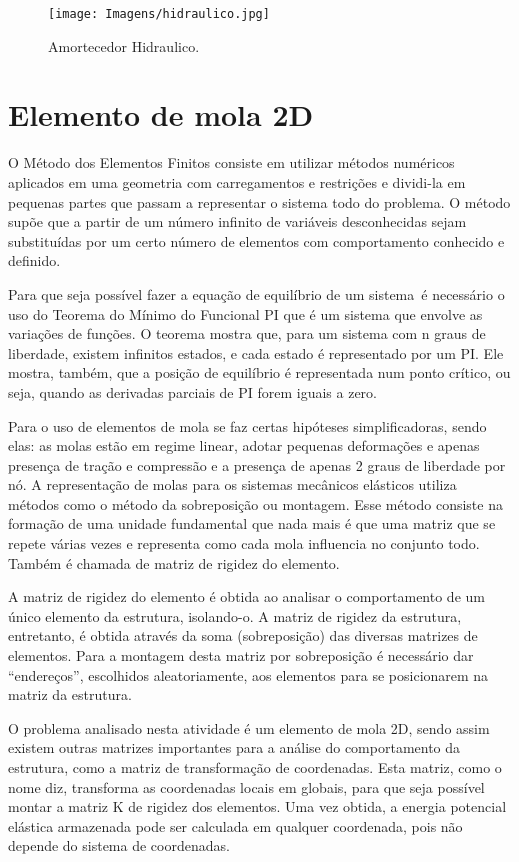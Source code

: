 \documentclass[deposito, acronym, symbols]{fei}
\begin{document}
\begin{figure}[!htb]
 \centering
    \caption{Amortecedor Hidraulico.}
    \texttt{[image: Imagens/hidraulico.jpg]}
    \label{fig:hidraulica}
 \end{figure}

\section{Elemento de mola 2D}
O Método dos Elementos Finitos consiste em utilizar métodos numéricos aplicados em uma geometria com carregamentos e restrições e dividi-la em pequenas partes que passam a representar o sistema todo do problema. O método supõe que a partir de um número infinito de variáveis desconhecidas sejam substituídas por um certo número de elementos com comportamento conhecido e definido. 

Para que seja possível fazer a equação de equilíbrio de um sistema é necessário o uso do Teorema do Mínimo do Funcional PI que é um sistema que envolve as variações de funções. O teorema mostra que, para um sistema com n graus de liberdade, existem infinitos estados, e cada estado é representado por um PI. Ele mostra, também, que a posição de equilíbrio é representada num ponto crítico, ou seja, quando as derivadas parciais de PI forem iguais a zero. 

Para o uso de elementos de mola se faz certas hipóteses simplificadoras, sendo elas: as molas estão em regime linear, adotar pequenas deformações e apenas presença de tração e compressão e a presença de apenas 2 graus de liberdade por nó. A representação de molas para os sistemas mecânicos elásticos utiliza métodos como o método da sobreposição ou montagem. Esse método consiste na formação de uma unidade fundamental que nada mais é que uma matriz que se repete várias vezes e representa como cada mola influencia no conjunto todo. Também é chamada de matriz de rigidez do elemento. 

A matriz de rigidez do elemento é obtida ao analisar o comportamento de um único elemento da estrutura, isolando-o. A matriz de rigidez da estrutura, entretanto, é obtida através da soma (sobreposição) das diversas matrizes de elementos. Para a montagem desta matriz por sobreposição é necessário dar “endereços”, escolhidos aleatoriamente, aos elementos para se posicionarem na matriz da estrutura.

O problema analisado nesta atividade é um elemento de mola 2D, sendo assim existem outras matrizes importantes para a análise do comportamento da estrutura, como a matriz de transformação de coordenadas. Esta matriz, como o nome diz, transforma as coordenadas locais em globais, para que seja possível montar a matriz K de rigidez dos elementos. Uma vez obtida, a energia potencial elástica armazenada pode ser calculada em qualquer coordenada, pois não depende do sistema de coordenadas. 
\end{document}

